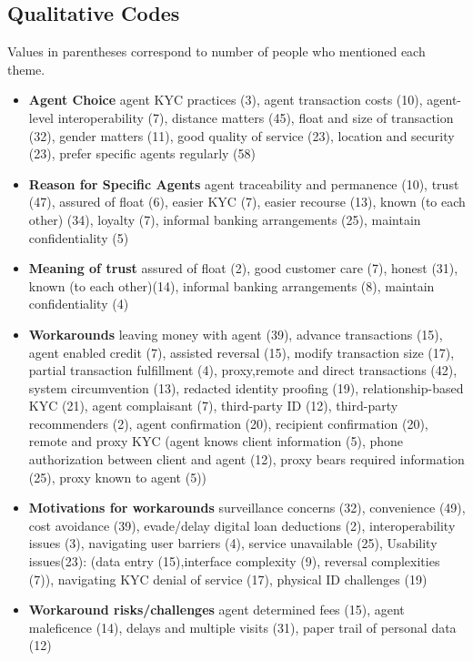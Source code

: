 \begin{appendices}
\section{Qualitative Codes}
\label{Appendix_Codes}
Values in parentheses correspond to number of people who mentioned each theme.
\begin{itemize}
    \item \textbf{Agent Choice}
    agent KYC practices (3), agent transaction costs (10), agent-level interoperability (7), distance matters (45), float and size of transaction (32), gender matters (11), good quality of service (23), location and security (23), prefer specific agents regularly (58)
    \medskip
    \item \textbf{Reason for Specific Agents}
    agent traceability and permanence (10), trust (47), assured of float (6), easier KYC (7), easier recourse (13), known (to each other) (34), loyalty (7), informal banking arrangements (25), maintain confidentiality (5)
    \medskip
    \item \textbf{Meaning of trust}
    assured of float (2), good customer care (7), honest (31), known (to each other)(14), informal banking arrangements (8), maintain confidentiality (4)
    \medskip
    \item \textbf{Workarounds}
    leaving money with agent (39), advance transactions (15), agent enabled credit (7), assisted reversal (15), modify transaction size (17), partial transaction fulfillment (4), proxy,remote and direct transactions (42), system circumvention (13), redacted identity proofing (19), relationship-based KYC (21), agent complaisant (7), third-party ID (12), third-party recommenders (2), agent confirmation (20), recipient confirmation (20), remote and proxy KYC (agent knows client information (5), phone authorization between client and agent (12), proxy bears required information (25), proxy known to agent (5))
    \medskip
    \item \textbf{Motivations for workarounds}
    surveillance concerns (32), convenience (49), cost avoidance (39), evade/delay digital loan deductions (2), interoperability issues (3), navigating user barriers (4),  service unavailable (25), Usability issues(23): (data entry (15),interface complexity (9), reversal complexities (7)), navigating KYC denial of service (17), physical ID challenges (19)
    \medskip
    \item \textbf{Workaround risks/challenges}
    agent determined fees (15), agent maleficence (14), delays and multiple visits (31), paper trail of personal data (12)

\end{itemize}
\end{appendices}
